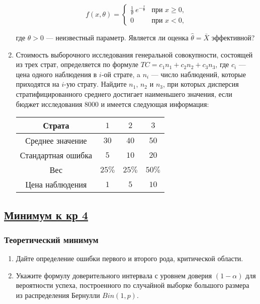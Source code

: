 \begin{enumerate}
\[
f(x,\theta) =
\begin{cases}
\frac{1}{\theta} \ e^{-\frac{x}{\theta}} & \text{при } x \geq 0, \\
0 & \text{при } x < 0, \end{cases}
\]

где $\theta > 0$ — неизвестный параметр. Является ли оценка  $\hat{\theta} = \bar{X}$ эффективной?

\item Стоимость выборочного исследования генеральной совокупности, состоящей из трех страт, определяется по формуле $TC = c_1n_1 + c_2n_2 + c_3n_3$, где $c_i$ — цена одного наблюдения в $i$-ой страте, a $n_i$ — число наблюдений, которые приходятся на $i$-ую страту. Найдите $n_1$, $n_2$ и $n_3$, при которых дисперсия стратифицированного среднего достигает наименьшего значения, если бюджет исследования 8000 и имеется следующая информация:

\begin{center}
\begin{tabular}{cccc}
\toprule
 Страта & $1$ & $2$ & $3$  \\
 \midrule
 Среднее значение & $30$ & $40$ & $50$ \\
 Стандартная ошибка  & $5$ & $10$ & $20$ \\
 Вес & $25\%$ & $25\%$ & $50\%$ \\
 Цена наблюдения & $1$ & $5$ & $10$ \\
 \bottomrule
\end{tabular}
\end{center}

\end{enumerate}







\subsection[Минимум к кр 4]{\hyperref[sec:sol_minimum_kr_04]{Минимум к кр 4}}
\label{sec:minimum_kr_04}





\subsubsection*{Теоретический минимум}


\begin{enumerate}
  \item Дайте определение ошибки первого и второго рода, критической области.
  \item Укажите формулу доверительного интервала с уровнем доверия $(1-\alpha)$ для вероятности успеха,
	построенного по случайной выборке большого размера из распределения Бернулли $Bin(1, p)$.
\end{enumerate}

